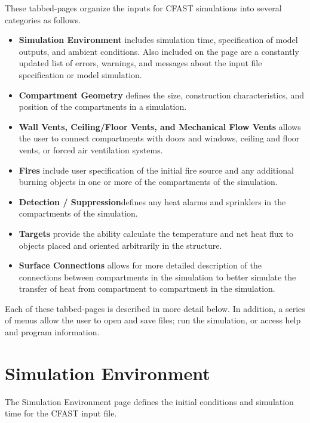 These tabbed-pages organize the inputs for CFAST simulations into several categories as follows.
\begin{itemize}
\item \textbf{Simulation Environment} includes simulation time, specification of model outputs, and ambient conditions. Also included on the page are a constantly updated list of errors, warnings, and messages about the input file specification or model simulation.
\item \textbf{Compartment Geometry} defines the size, construction characteristics, and position of the compartments in a simulation.
\item \textbf{Wall Vents, Ceiling/Floor Vents, and Mechanical Flow Vents} allows the user to connect compartments with doors and windows, ceiling and floor vents, or forced air ventilation systems.
\item \textbf{Fires} include user specification of the initial fire source and any additional burning objects in one or more of the compartments of the simulation.
\item \textbf{Detection / Suppression}defines any heat alarms and sprinklers in the compartments of the simulation.
\item \textbf{Targets} provide the ability calculate the temperature and net heat flux to objects placed and oriented arbitrarily in the structure.
\item \textbf{Surface Connections} allows for more detailed description of the connections between compartments in the simulation to better simulate the transfer of heat from compartment to compartment in the simulation.
\end{itemize}

Each of these tabbed-pages is described in more detail below. In addition, a series of menus allow the user to open and save files; run the simulation, or access help and program information.

\newpage
\section{Simulation Environment}

The Simulation Environment page defines the initial conditions and simulation time for the CFAST input file.

